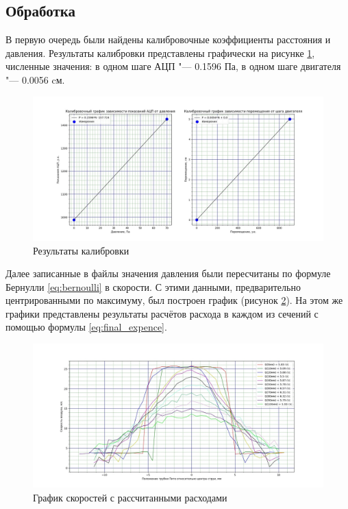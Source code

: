         \subsection*{Обработка}
            В первую очередь были найдены калибровочные коэффициенты расстояния и давления. Результаты калибровки представлены графически на рисунке \ref{fig:calibration}, численные значения: в одном шаге АЦП "--- 0.1596 Па, в одном шаге двигателя "--- 0.0056 cм.
            
            \begin{figure}[h]
                \centering
                \includegraphics[width=\textwidth]{calibration.jpg}
                \caption{Результаты калибровки}
                \label{fig:calibration}
            \end{figure}

            Далее записанные в файлы значения давления были пересчитаны по формуле Бернулли \ref{eq:bernoulli} в скорости. С этими данными, предварительно центрированными по максимуму, был построен график (рисунок \ref{fig:expence}). На этом же графики представлены результаты расчётов расхода в каждом из сечений с помощью формулы \ref{eq:final_expence}.

            \begin{figure}[h!]
                \centering
                \includegraphics[width=\textwidth]{expence.jpg}
                \caption{График скоростей с рассчитанными расходами}
                \label{fig:expence}
            \end{figure}

